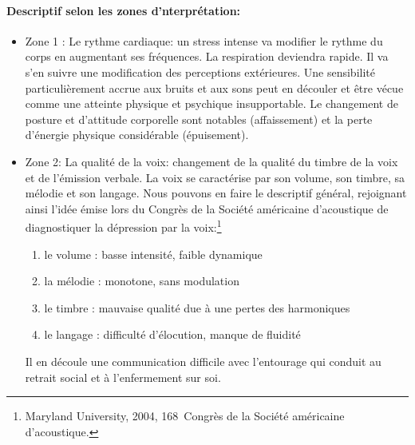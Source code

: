                           \paragraph{Descriptif selon les zones d'nterprétation:}

                    \begin{itemize}
                      	\item Zone 1 :  Le rythme cardiaque: un stress intense va modifier le rythme
                      du corps en augmentant ses fréquences. La respiration deviendra
                      rapide. Il va s'en suivre une modification des perceptions
                      extérieures. Une sensibilité particulièrement accrue aux bruits et
                      aux sons peut en découler et être vécue comme une
                      atteinte physique et psychique insupportable.
                      Le changement de posture et d'attitude corporelle sont
                    notables (affaissement) et la perte d'énergie physique considérable (épuisement).
                    	\item Zone 2: La qualité de la voix: changement de la qualité du timbre de la
                     voix et de l'émission verbale.
                      La voix se caractérise par son volume, son timbre, sa mélodie et son
                      langage. Nous pouvons en faire le
                            descriptif général, rejoignant ainsi l'idée émise lors du Congrès de la Société
                            américaine d'acoustique \autocite{le_service_metronews}
                            de diagnostiquer la
                            dépression par la voix:\footnote{Maryland University, 2004, 168\ieme\ Congrès de la Société
                    américaine d'acoustique.}

                     	\begin{enumerate}
                     		\item le volume : basse intensité, faible dynamique
                     		\item la mélodie : monotone, sans modulation
                     		\item le timbre : mauvaise qualité due à une pertes des harmoniques
                     		\item le langage : difficulté d'élocution, manque de fluidité
                     	\end{enumerate}
                            Il en découle une communication difficile avec l'entourage qui
                            conduit au retrait social et à l'enfermement sur soi.


\end{itemize}
